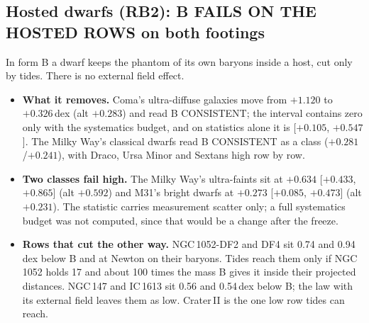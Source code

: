 \documentclass[10pt]{article}
\begin{document}
\subsection{Hosted dwarfs (RB2): B FAILS ON THE HOSTED ROWS on both footings}
In form B a dwarf keeps the phantom of its own baryons inside a host, cut only by tides. There is no external field effect.
\begin{itemize}
\item \textbf{What it removes.} Coma's ultra-diffuse galaxies move from $+1.120$ to $+0.326$\,dex (alt $+0.283$) and read B CONSISTENT; the interval contains zero only with the systematics budget, and on statistics alone it is [$+0.105$, $+0.547$]. The Milky Way's classical dwarfs read B CONSISTENT as a class ($+0.281$/$+0.241$), with Draco, Ursa Minor and Sextans high row by row.
\item \textbf{Two classes fail high.} The Milky Way's ultra-faints sit at $+0.634$ [$+0.433$, $+0.865$] (alt $+0.592$) and M31's bright dwarfs at $+0.273$ [$+0.085$, $+0.473$] (alt $+0.231$). The statistic carries measurement scatter only; a full systematics budget was not computed, since that would be a change after the freeze.
\item \textbf{Rows that cut the other way.} NGC\,1052-DF2 and DF4 sit 0.74 and 0.94\,dex below B and at Newton on their baryons. Tides reach them only if NGC\,1052 holds 17 and about 100 times the mass B gives it inside their projected distances. NGC\,147 and IC\,1613 sit 0.56 and 0.54\,dex below B; the law with its external field leaves them as low. Crater\,II is the one low row tides can reach.
\end{itemize}
\end{document}
